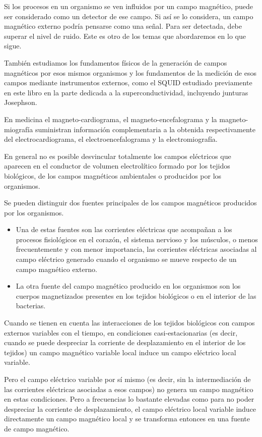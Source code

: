 Si los procesos en un organismo se ven influidos por un campo magnético, puede ser considerado como un detector de ese campo. Si así se lo considera, un campo magnético externo podría pensarse como una señal. Para ser detectada, debe superar el nivel de ruido. Este es otro de los temas que abordaremos en lo que sigue.

También estudiamos los fundamentos físicos de la generación de campos magnéticos por esos mismos organismos y los fundamentos de la medición de esos campos mediante instrumentos externos, como el SQUID estudiado previamente en este libro en la parte dedicada a la superconductividad, incluyendo junturas Josephson.

En medicina el magneto-cardiograma, el magneto-encefalograma y la magneto-miografía suministran información complementaria a la obtenida respectivamente del electrocardiograma, el electroencefalograma y la electromiografía.

En general no es posible desvincular totalmente los campos eléctricos que aparecen en el conductor de volumen electrolítico formado por los tejidos biológicos, de los campos magnéticos ambientales o producidos por los organismos.

Se pueden distinguir dos fuentes principales de los campos magnéticos producidos por los organismos.

\begin{itemize}
	\item Una de estas fuentes son las corrientes eléctricas que acompañan a los procesos fisiológicos en el corazón, el sistema nervioso y los músculos, o menos frecuentemente y con menor importancia, las corrientes eléctricas asociadas al campo eléctrico generado cuando el organismo se mueve respecto de un campo magnético externo.
	
	\item La otra fuente del campo magnético producido en los organismos son los cuerpos magnetizados presentes en los tejidos biológicos o en el interior de las bacterias.
\end{itemize}

Cuando se tienen en cuenta las interacciones de los tejidos biológicos con campos externos variables con el tiempo, en condiciones casi-estacionarias (es decir, cuando se puede despreciar la corriente de desplazamiento en el interior de los tejidos) un campo magnético variable local induce un campo eléctrico local variable.

Pero el campo eléctrico variable por sí mismo (es decir, sin la intermediación de las corrientes eléctricas asociadas a esos campos) no genera un campo magnético en estas condiciones.
Pero a frecuencias lo bastante elevadas como para no poder despreciar la corriente de desplazamiento, el campo eléctrico local variable induce directamente un campo magnético local y se transforma entonces en una fuente de campo magnético.

